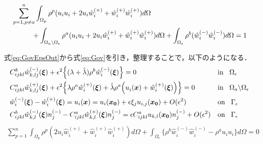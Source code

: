 \begin{align}
	&\sum_{p=1,p\neq a}^{n}\int_{\Omega_p}\rho^{p}(u_{i}u_{i}+2u_{i}\hat{w}_{i}^{(+)}+\hat{w}_{i}^{(+)}\hat{w}_{i}^{(+)}) d\Omega
	\nonumber
	\\
	&\hspace{1.0cm}+\int_{\Omega_a\backslash\Omega_{\epsilon}}\rho^{a}(u_{i}u_{i}+2u_{i}\hat{w}_{i}^{(+)}+\hat{w}_{i}^{(+)}\hat{w}_{i}^{(+)}) d\Omega
	+\int_{\Omega_{\epsilon}}\rho^{b}(\hat{w}_{i}^{(-)}\hat{w}_{i}^{(-)}) d\Omega=1
	\label{eq:GovEpsNorm}
\end{align}

式\eqref{eq:GovEpsOut}から式\eqref{eq:Gov}を引き，整理することで，以下のようになる．
\begin{align}
	&C_{ijkl}^{b} \hat{w}^{(-)}_{k,lj}(\bm{\xi})
	+\epsilon^2\Bigl\{(\lambda+\hat{\lambda})\rho^{b} \hat{w}_{i}^{(-)}(\bm{\xi})\Bigr\}=0
	&&\text{in}\hspace{0.3cm}\Omega_{\epsilon}
	\label{eq:GovDisturIn}
	\\
	&C_{ijkl}^{a}\hat{w}^{(+)}_{k,lj}(\bm{\xi})
	+\epsilon^2\Bigl \{\lambda\rho^{a} \hat{w}_{i}^{(+)}(\bm{\xi})
	+\hat{\lambda}\rho^{a} \Bigl(u_{i}^{}(\bm{x})+\hat{w}_{i}^{(+)}(\bm{\xi}) \Bigr) \Bigr \}=0
	&&\text{in}\hspace{0.3cm}\Omega_{a}\backslash\Omega_{\epsilon}
	\label{eq:GovDisturOut}
	\\
	&\hat{w}_{i}^{(-)}(\bm{\xi})-\hat{w}_{i}^{(+)}(\bm{\xi})=u_{i}(\bm{x})=u_{i}(\bm{x_0})+\epsilon \xi_j u_{i,j}(\bm{x_0})+O(\epsilon^2)
	&&\text{on}\hspace{0.3cm}\Gamma_{\epsilon}
	\label{eq:GovDisturUBC}
	\\
	&C_{ijkl}^{b}\hat{w}_{k,l}^{(-)}(\bm{\xi})n_{j}^{(-)}
	-C_{ijkl}^{a}\hat{w}_{k,l}^{(+)}(\bm{\xi})n_{j}^{(-)}
	=\epsilon C_{ijkl}^{a}u_{k,l}(\bm{x_0})n_{j}^{(-)}+O(\epsilon^2)
	&&\text{on}\hspace{0.3cm}\Gamma_{\epsilon}
	\label{eq:GovDisturSBC}
\end{align}
\begin{align}
	\sum_{p=1}^{n}\int_{\Omega_p}\rho^{p}(2u_{i}\hat{w}_{i}^{(+)}+\hat{w}_{i}^{(+)}\hat{w}_{i}^{(+)}) d\Omega
	+\int_{\Omega_{\epsilon}}\{\rho^{b}\hat{w}_{i}^{(-)}\hat{w}_{i}^{(-)}-\rho^{a}u_{i}u_{i}\} d\Omega=0
	\label{eq:GovDisturNorm}
\end{align}

